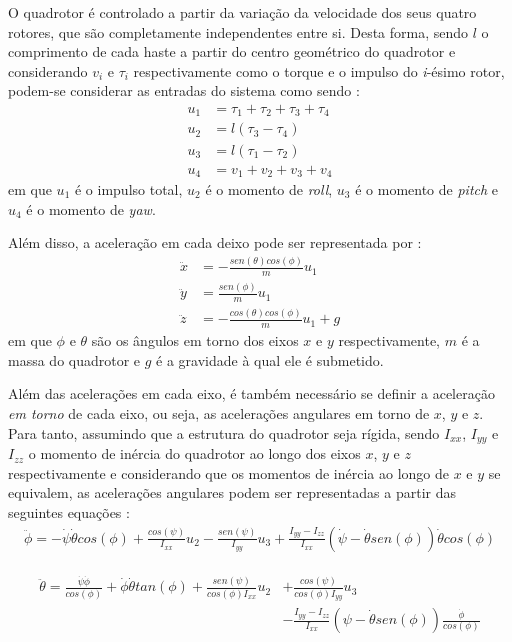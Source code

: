 O quadrotor é controlado a partir da variação da velocidade dos seus quatro rotores, que são completamente independentes entre si. Desta forma, sendo $l$ o comprimento de cada haste a partir do centro geométrico do quadrotor e considerando $v_i$ e $\tau_i$ respectivamente como o torque e o impulso do \textit{i}-ésimo rotor, podem-se considerar as entradas do sistema como sendo \cite[p.~4]{Balas2007}:
\begin{align}
u_1 &= \tau_1+\tau_2+\tau_3+\tau_4 \\
u_2 &= l(\tau_3-\tau_4) \\
u_3 &= l(\tau_1-\tau_2) \\
u_4 &= v_1+v_2+v_3+v_4
\end{align}
em que $u_1$ é o impulso total, $u_2$ é o momento de \textit{roll}, $u_3$ é o momento de \textit{pitch} e $u_4$ é o momento de \textit{yaw}.

Além disso, a aceleração em cada deixo pode ser representada por \cite[p.~5]{Balas2007}:
\begin{align}
\ddot{x} &= -\frac{sen(\theta)cos(\phi)}{m}u_1  \\
\ddot{y} &= \frac{sen(\phi)}{m}u_1  \\
\ddot{z} &= - \frac{cos(\theta)cos(\phi)}{m}u_1 +g
\end{align}
em que $\phi$ e $\theta$ são os ângulos em torno dos eixos $x$ e $y$ respectivamente, $m$ é a massa do quadrotor e $g$ é a gravidade à qual ele é submetido.

Além das acelerações em cada eixo, é também necessário se definir a aceleração \textit{em torno} de cada eixo, ou seja, as acelerações angulares em torno de $x$, $y$ e $z$. Para tanto, assumindo que a estrutura do quadrotor seja rígida, sendo $I_{xx}$, $I_{yy}$ e $I_{zz}$ o momento de inércia do quadrotor ao longo dos eixos $x$, $y$ e $z$ respectivamente e considerando que os momentos de inércia ao longo de $x$ e $y$ se equivalem, as acelerações angulares podem ser representadas a partir das seguintes equações \cite[p.~6]{Balas2007}:
\begin{align}
\ddot{\phi} = -\dot{\psi}\dot{\theta}cos(\phi) + 
\frac{cos(\psi)}{I_{xx}}u_2 - 
\frac{sen(\psi)}{I_{yy}}u_3 + 
\frac{I_{yy}-I_{zz}}{I_{xx}}(\dot{\psi}-\dot{\theta}sen(\phi))\dot{\theta}cos(\phi)
\end{align}

\begin{align}
\begin{split}
\ddot{\theta} = \frac{\dot{\psi}\dot{\phi}}{cos(\phi)} +
\dot{\phi}\dot{\theta}tan(\phi) + 
\frac{sen(\psi)}{cos(\phi)I_{xx}}u_2 &+ 
\frac{cos(\psi)}{cos(\phi)I_{yy}}u_3 \\ 
&-\frac{I_{yy}-I_{zz}}{I_{xx}}(\psi-\dot{\theta}sen(\phi))\frac{\dot{\phi}}{cos(\phi)}
\end{split}
\end{align}

